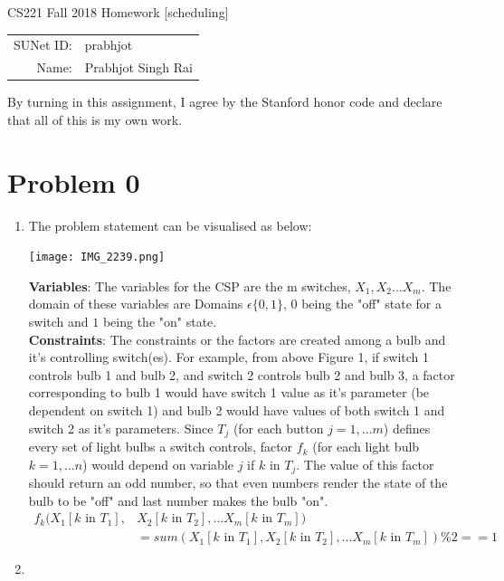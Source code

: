 \documentclass[12pt]{article}
\begin{document}
\begin{center}
{\Large CS221 Fall 2018 Homework [scheduling]}

\begin{tabular}{rl}
SUNet ID: & prabhjot \\
Name: & Prabhjot Singh Rai
\end{tabular}
\end{center}

By turning in this assignment, I agree by the Stanford honor code and declare
that all of this is my own work.

\section*{Problem 0}

\begin{enumerate}[label=(\alph*)]
  \item The problem statement can be visualised as below: \\
  \begin{center}
  \texttt{[image: IMG\_2239.png]}
  \end{center}
  \textbf{Variables}: The variables for the CSP are the m switches, $X_1, X_2 ... X_m$. The domain of these variables are Domains $   \epsilon \{0, 1\}$, $0$ being the "off" state for a switch and $1$ being the "on" state. \\
  \textbf{Constraints}: The constraints or the factors are created among a bulb and it's controlling switch(es). For example, from above Figure 1, if switch 1 controls bulb 1 and bulb 2, and switch 2 controls bulb 2 and bulb 3, a factor corresponding to bulb 1 would have switch 1 value as it's parameter (be dependent on switch 1) and bulb 2 would have values of both switch 1 and switch 2 as it's parameters. Since $T_j$ (for each button $j=1, ...m$) defines every set of light bulbs a switch controls, factor $f_k$ (for each light bulb $k=1,...n$) would depend on variable $j$ if $k$ in $T_j$. The value of this factor should return an odd number, so that even numbers render the state of the bulb to be "off" and last number makes the bulb "on".
  \begin{align*}
  f_k (X_1[\text{$k$ in $T_1$}], & X_2[\text{$k$ in $T_2$}], ... X_m[\text{$k$ in $T_m$}]) \\ & = sum(X_1[\text{$k$ in $T_1$}], X_2[\text{$k$ in $T_2$}], ... X_m[\text{$k$ in $T_m$}]) \% 2 == 1
  \end{align*}
  \item
  \begin{enumerate}

\end{enumerate}
\end{enumerate}
\end{document}

